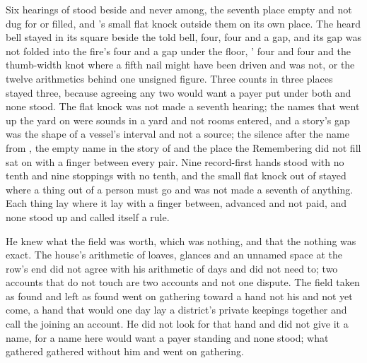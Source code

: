 Six hearings of  stood beside and never among, the seventh place empty and not dug for or filled, and 's small flat knock outside them on its own place. The heard bell stayed in its square beside the told bell, four, four and a gap, and its gap was not folded into the fire's four and a gap under the floor, ' four and four and the thumb-width knot where a fifth nail might have been driven and was not, or the twelve arithmetics behind one unsigned figure. Three counts in three places stayed three, because agreeing any two would want a payer put under both and none stood. The flat knock was not made a seventh hearing; the names that went up the yard on  were sounds in a yard and not rooms entered, and a story's gap was the shape of a vessel's interval and not a source; the silence after the name from , the empty name in the story of  and the place the Remembering did not fill sat on  with a finger between every pair. Nine record-first hands stood with no tenth and nine stoppings with no tenth, and the small flat knock out of  stayed where a thing out of a person must go and was not made a seventh of anything. Each thing lay where it lay with a finger between, advanced and not paid, and none stood up and called itself a rule.

He knew what the field was worth, which was nothing, and that the nothing was exact. The house's arithmetic of loaves, glances and an unnamed space at the row's end did not agree with his arithmetic of days and did not need to; two accounts that do not touch are two accounts and not one dispute. The field taken as found and left as found went on gathering toward a hand not his and not yet come, a hand that would one day lay a district's private keepings together and call the joining an account. He did not look for that hand and did not give it a name, for a name here would want a payer standing and none stood; what gathered gathered without him and went on gathering.

\scenebreak

